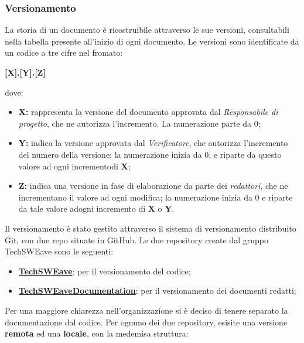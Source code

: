         \subsubsection{Versionamento}
        La storia di un documento è ricostruibile attraverso le sue versioni, consultabili nella tabella presente all'inizio di ogni documento. Le versioni sono identificate da un codice a tre cifre nel fromato: 
        \begin{center}
            \textbf{\large [X].[Y].[Z]}\\             
        \end{center}
        dove: 
        \begin{itemize}
            \item \textbf{\large X:} rappresenta la versione del documento approvata dal \textit{Responsabile di progetto}, che ne autorizza l'incremento. La numerazione parte da 0;
            \item \textbf{\large Y:} indica la versione approvata dal \textit{Verificatore}, che autorizza l’incremento del numero della versione; la numerazione inizia da 0, e riparte da questo valore ad ogni incrementodi \textbf{X};
            \item \textbf{\large Z:} indica una versione in fase di elaborazione da parte dei \textit{redattori}, che ne incrementano il valore ad ogni modifica; la numerazione inizia da 0 e riparte da tale valore adogni incremento di \textbf{X} o \textbf{Y}.
        \end{itemize}
        Il versionamento è stato gestito attraverso il sistema di versionamento distribuito Git, con due repo situate in GitHub.
        Le due repository create dal gruppo TechSWEave sono le seguenti:
        \begin{itemize}
            \item \textbf{\href{https://github.com/techsweave/TechSWEave.git}{TechSWEave}}: per il versionamento del codice;
            \item \textbf{\href{https://github.com/techsweave/TechSWEaveDocumentation.git}{TechSWEaveDocumentation}}: per il versionamento dei documenti redatti;
        \end{itemize}
        Per una maggiore chiarezza nell'organizzazione si è deciso di tenere separato la documentazione dal codice.
        Per ognuno dei due repository, esisite una versione \textbf{remota} ed una \textbf{locale}, con la medemisa struttura: 
